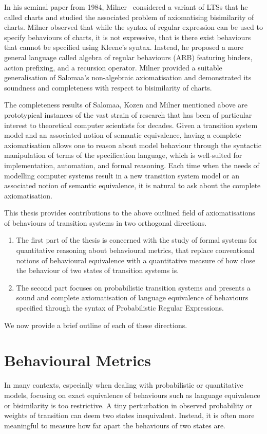In his seminal paper from 1984, Milner~\cite{Milner:1984:Complete} considered a variant of LTSs that he called charts and studied the associated problem of axiomatising bisimilarity of charts. Milner observed that while the syntax of regular expression can be used to specify behaviours of charts, it is not expressive, that is there exist behaviours that cannot be specified using Kleene's syntax. Instead, he proposed a more general language called algebra of regular behaviours (ARB) featuring binders, action prefixing, and a recursion operator. Milner provided a suitable generalisation of Salomaa's non-algebraic axiomatisation and demonstrated its soundness and completeness with respect to bisimilarity of charts.   

The completeness results of Salomaa, Kozen and Milner mentioned above are prototypical instances of the vast strain of research that has been of particular interest to theoretical computer scientists for decades. Given a transition system model and an associated notion of semantic equivalence, having a complete axiomatisation allows one to reason about model behaviour through the syntactic manipulation of terms of the specification language, which is well-suited for implementation, automation, and formal reasoning. Each time when the needs of modelling computer systems result in a new transition system model or an associated notion of semantic equivalence, it is natural to ask about the complete axiomatisation. 

This thesis provides contributions to the above outlined field of axiomatisations of behaviours of transition systems in two orthogonal directions.
\begin{enumerate}
	\item The first part of the thesis is concerned with the study of formal systems for quantitative reasoning about behavioural metrics, that replace conventional notions of behavioural equivalence with a quantitative measure of how close the behaviour of two states of transition systems is.
	\item The second part focuses on probabilistic transition systems and presents a sound and complete axiomatisation of language equivalence of behaviours specified through the syntax of Probabilistic Regular Expressions.
	\end{enumerate}	
We now provide a brief outline of each of these directions.
\section{Behavioural Metrics}
In many contexts, especially when dealing with probabilistic or quantitative models, focusing on exact equivalence of behaviours such as language equivalence or bisimilarity is too restrictive. A tiny perturbation in observed probability or weights of transition can deem two states inequivalent.  Instead, it is often more meaningful to measure how far apart the behaviours of two states are. 

